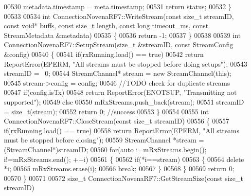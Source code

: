 \begin{DoxyCode}
{{{{{{{{{{{{00530     metadata.timestamp = meta.timestamp;
00531     \textcolor{keywordflow}{return} status;
00532 \}
00533 
00534 \textcolor{keywordtype}{int} ConnectionNovenaRF7::WriteStream(\textcolor{keyword}{const} \textcolor{keywordtype}{size\_t} streamID, \textcolor{keyword}{const} \textcolor{keywordtype}{void}* buffs, \textcolor{keyword}{const} \textcolor{keywordtype}{size\_t} 
      length, \textcolor{keyword}{const} \textcolor{keywordtype}{long} timeout_ms, \textcolor{keyword}{const} StreamMetadata &metadata)
00535 \{
00536     \textcolor{keywordflow}{return} -1;
00537 \}
00538 
00539 \textcolor{keywordtype}{int} ConnectionNovenaRF7::SetupStream(\textcolor{keywordtype}{size\_t} &streamID, \textcolor{keyword}{const} StreamConfig &config)
00540 \{
00541     \textcolor{keywordflow}{if}(rxRunning.load() == \textcolor{keyword}{true})
00542         \textcolor{keywordflow}{return} ReportError(EPERM, \textcolor{stringliteral}{"All streams must be stopped before doing setups"});
00543     streamID = ~0;
00544     StreamChannel* stream = \textcolor{keyword}{new} StreamChannel(\textcolor{keyword}{this});
00545     stream->config = config;
00546     \textcolor{comment}{//TODO check for duplicate streams}
00547     \textcolor{keywordflow}{if}(config.isTx)
00548         \textcolor{keywordflow}{return} ReportError(ENOTSUP, \textcolor{stringliteral}{"Transmitting not supported"});
00549     \textcolor{keywordflow}{else}
00550         mRxStreams.push\_back(stream);
00551     streamID = size\_t(stream);
00552     \textcolor{keywordflow}{return} 0; \textcolor{comment}{//success}
00553 \}
00554 
00555 \textcolor{keywordtype}{int} ConnectionNovenaRF7::CloseStream(\textcolor{keyword}{const} \textcolor{keywordtype}{size\_t} streamID)
00556 \{
00557     \textcolor{keywordflow}{if}(rxRunning.load() == \textcolor{keyword}{true})
00558         \textcolor{keywordflow}{return} ReportError(EPERM, \textcolor{stringliteral}{"All streams must be stopped before closing"});
00559     StreamChannel *stream = (StreamChannel*)streamID;
00560     \textcolor{keywordflow}{for}(\textcolor{keyword}{auto} i=mRxStreams.begin(); i!=mRxStreams.end(); ++i)
00561     \{
00562         \textcolor{keywordflow}{if}(*i==stream)
00563         \{
00564             \textcolor{keyword}{delete} *i;
00565             mRxStreams.erase(i);
00566             \textcolor{keywordflow}{break};
00567         \}
00568     \}
00569     \textcolor{keywordflow}{return} 0;
00570 \}
00571 
00572 \textcolor{keywordtype}{size\_t} ConnectionNovenaRF7::GetStreamSize(\textcolor{keyword}{const} \textcolor{keywordtype}{size\_t} streamID)
}}}}}}}}}}}}
\end{DoxyCode}

